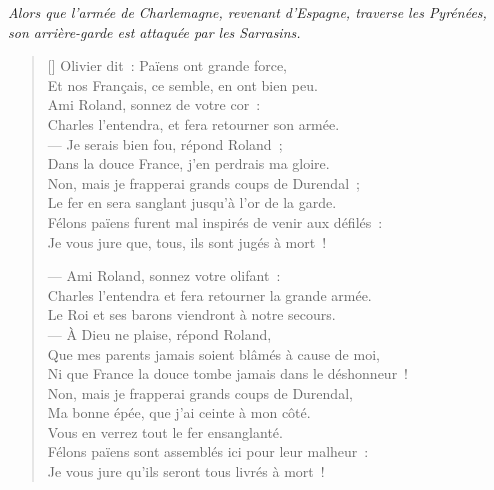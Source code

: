 \documentclass[a4paper,14pt,french]{extarticle}
\begin{document}

\begin{center}
\begin{minipage}{\versewidth}
\small\itshape
Alors que l'armée de Charlemagne, revenant d'Espagne, traverse les Pyrénées, son arrière-garde est attaquée par les Sarrasins.
\end{minipage}
\end{center}

\begin{verse}[\versewidth]
Olivier dit : Païens ont grande force,\\
Et nos Français, ce semble, en ont bien peu.\\
Ami Roland, sonnez de votre cor :\\
Charles l’entendra, et fera retourner son armée.\\
— Je serais bien fou, répond Roland ;\\
Dans la douce France, j’en perdrais ma gloire.\\
Non, mais je frapperai grands coups de Durendal ;\\
Le fer en sera sanglant jusqu’à l’or de la garde.\\
Félons païens furent mal inspirés de venir aux défilés :\\
Je vous jure que, tous, ils sont jugés à mort !

— Ami Roland, sonnez votre olifant :\\
Charles l’entendra et fera retourner la grande armée.\\
Le Roi et ses barons viendront à notre secours.\\
— À Dieu ne plaise, répond Roland,\\
Que mes parents jamais soient blâmés à cause de moi,\\
Ni que France la douce tombe jamais dans le déshonneur !\\
Non, mais je frapperai grands coups de Durendal,\\
Ma bonne épée, que j’ai ceinte à mon côté.\\
Vous en verrez tout le fer ensanglanté.\\
Félons païens sont assemblés ici pour leur malheur :\\
Je vous jure qu’ils seront tous livrés à mort !


\end{verse}
\end{document}
